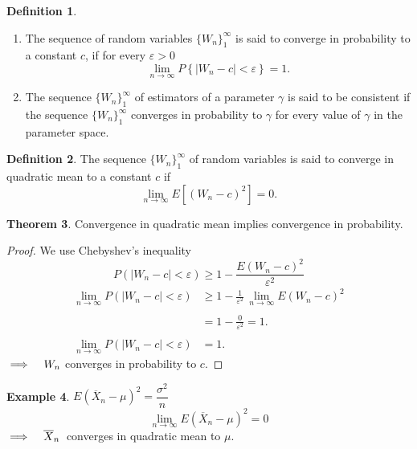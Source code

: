 \documentclass[12pt,a4paper]{report}
\theoremstyle{definition}
\newtheorem{thm}{Theorem}[section]
\newtheorem{defn}[thm]{Definition}
\newtheorem{exa}[thm]{Example}
\theoremstyle{plain}
\begin{document}
\begin{defn}
\begin{enumerate}
\item[(a)]The sequence of random variables $\{W_n\}^{\infty}_1$ is said to converge in probability to a constant $c$, if for every $\varepsilon > 0$
$$\lim_{n \rightarrow \infty} P\left\{\left|W_n - c\right| < \varepsilon\right\} = 1.$$
\item[(b)] The sequence $\{W_n\}^{\infty}_1$ of estimators of a parameter $\gamma$ is said to be consistent if the sequence  $\{W_n\}^{\infty}_1$ converges in probability to $\gamma$ for every value of $\gamma$ in the parameter space.
\end{enumerate}
\end{defn}


\begin{defn}
The sequence $\{W_n\}^{\infty}_1$ of random variables is said to converge in quadratic mean to a constant $c$ if
$$\lim_{n\rightarrow \infty} E\left[(W_n - c)^2\right] = 0.$$
\end{defn}

\begin{thm}
Convergence in quadratic mean implies convergence in probability.
\end{thm}


\begin{proof}
We use Chebyshev's inequality
$$P\left(\left|W_n - c\right| < \varepsilon\right) \geq 1 - \frac{E(W_n - c)^2}{\varepsilon^2}$$
\begin{align*}
\lim_{n\rightarrow\infty}P\left(\left|W_n - c\right| < \varepsilon\right) & \geq 1 - \frac{1}{\varepsilon^2}\, \lim_{n\rightarrow \infty} E(W_n - c)^2\\\\
& = 1 - \frac{0}{\varepsilon^2} = 1.\\\\
\lim_{n\rightarrow\infty}P\left(\left|W_n - c\right| < \varepsilon\right) & = 1.
\end{align*}
$\implies\hspace{0.3cm} W_n$ converges in probability to $c$.
\end{proof}



\begin{exa}
$E(\overline{X}_n - \mu)^2 = \dfrac{\sigma^2}{n}$  $$\lim_{n\rightarrow\infty}E(\overline{X}_n - \mu)^2 = 0$$
$\implies \hspace{0.3cm} \overline{X}_n\,$ converges in quadratic mean to $\mu$.\\
\end{exa}
\end{document}
